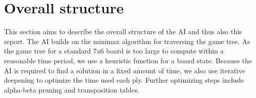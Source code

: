 \section{Overall structure}
This section aims to describe the overall structure of the AI and thus also this report.
The AI builds on the minimax algorithm for traversing the game tree.
As the game tree for a standard 7x6 board is too large to compute within a reasonable time period, we use a heuristic function for a board state.
Because the AI is required to find a solution in a fixed amount of time, we also use iterative deepening to optimize the time used each ply.
Further optimizing steps include alpha-beta pruning and transposition tables.
